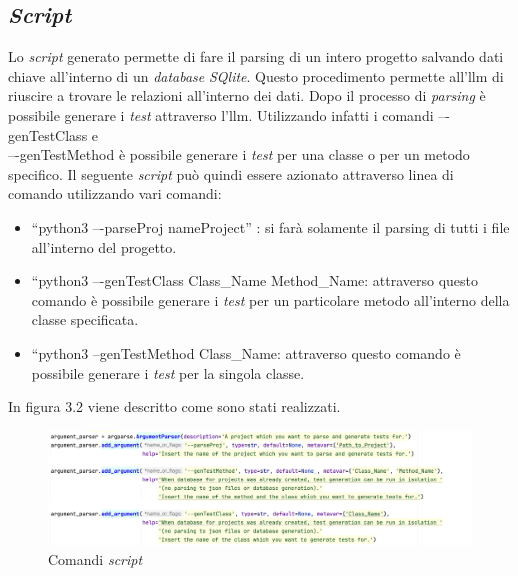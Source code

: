     \subsection{\textit{Script}}
    Lo \textit{script} generato permette di fare il parsing di un intero progetto salvando dati chiave all’interno di un \textit{database} \textit{SQlite}. 
    Questo procedimento permette all'\gls{llm} di riuscire a trovare le relazioni all’interno dei dati. 
    Dopo il processo di \textit{parsing} è possibile generare i \textit{test} attraverso l'\gls{llm}. Utilizzando infatti i comandi –-genTestClass e\\ 
    –-genTestMethod è possibile generare i \textit{test} per una classe o per un metodo specifico.
    Il seguente \textit{script} può quindi essere azionato attraverso linea di comando utilizzando vari comandi:
    \begin{itemize}
        \item “python3 –-parseProj nameProject” : si farà solamente il parsing di tutti i file all’interno del progetto.
        \item “python3 –-genTestClass Class\_Name Method\_Name: attraverso questo comando è possibile generare i \textit{test} per un particolare metodo all’interno della classe specificata.
        \item “python3 --genTestMethod Class\_Name: attraverso questo comando è possibile generare i \textit{test} per la singola classe.
    \end{itemize}
    In figura 3.2 viene descritto come sono stati realizzati.\\
    \begin{figure}[!h]
        \centering        
        \includegraphics[width=14.5cm]{img/script argument.png}
        \caption{Comandi \textit{script}}
    \end{figure}\newline

